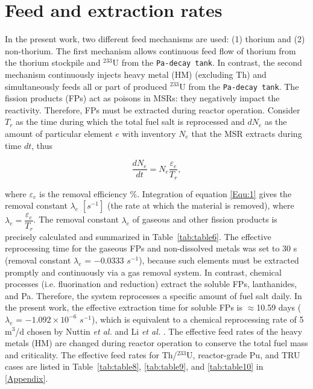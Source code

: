 \section{Feed and extraction rates} \label{Feed-and-extraction-rates}
In the present work, two different feed mechanisms are used: (1) thorium and (2) non-thorium.
The first mechanism allows continuous feed flow of thorium from the thorium stockpile and 
$^{233}$U from the \texttt{Pa-decay tank}. In contrast, the second mechanism 
continuously injects heavy metal (HM) (excluding Th) and simultaneously feeds  
all or part of produced $^{233}$U from the \texttt{Pa-decay tank}. The fission 
products (FPs) act as poisons in MSRs: they negatively impact the reactivity. 
Therefore, \gls{FPs} must be extracted during reactor operation. Consider 
$T_{r}$ as the time during which the total fuel salt is reprocessed and 
$dN_{e}$ as the amount of particular element $e$ with inventory $N_{e}$ that 
the \gls{MSR} extracts during time $dt$, thus \cite{nuttin2005potential}

\begin{equation}
\label{Equ:1}
\dfrac{dN_{e}}{dt} = N_{e}\dfrac{\varepsilon_{e}}{T_{r}},	
\end{equation}

where $\varepsilon_{e}$ is the removal efficiency \%. Integration of equation \ref{Equ:1} gives 
the removal constant $\lambda_{e}$ $[s^{-1}]$ (the rate at which the material 
is removed), where $\lambda_{e}=\dfrac{{\varepsilon_{e}}}{{T}_{r}}$. The removal constant 
$\lambda_{e}$ of gaseous and other fission products is precisely calculated 
and summarized in Table~\ref{tab:table6}. The effective reprocessing time for 
the gaseous \gls{FPs} and non-dissolved metals was set to 30 s (removal 
constant $\lambda_{e}$ = $-0.0333$ $s^{-1}$), because such elements must be 
extracted promptly and continuously via a gas removal system. In contrast, 
chemical processes (i.e. fluorination and reduction) extract the soluble \gls{FPs}, lanthanides, and Pa.
Therefore, the system reprocesses a specific amount of fuel salt daily. In the 
present work, the effective extraction time for soluble \gls{FPs} is 
$\approx$10.59 days ($\lambda_{e}$ = $-1.092\times10^{-6}$ $s^{-1}$), which is 
equivalent to a chemical reprocessing rate of 5 m$^3$/d chosen by Nuttin \emph{et al.} \cite{nuttin2005potential} and Li \emph{et al.} \cite{li_optimization_2018}. The effective feed rates of 
the heavy metals (HM) are changed during reactor operation to conserve the 
total fuel mass and criticality. The effective feed rates for Th/$^{233}$U, reactor-grade Pu, and TRU cases are listed in Table~\ref{tab:table8}, \ref{tab:table9}, and \ref{tab:table10} in \ref{Appendix}.


